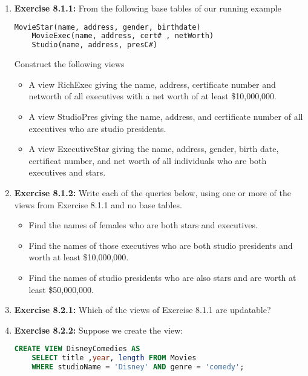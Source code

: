 \documentclass[12pt]{article}
\begin{document}
\begin{enumerate}[1.]
    \item \textbf{Exercise 8.1.1:} From the following base tables of our running
    example

    \bigskip

    \begin{lstlisting}[language=SQL]
    MovieStar(name, address, gender, birthdate)
    MovieExec(name, address, cert# , netWorth)
    Studio(name, address, presC#)
    \end{lstlisting}

    \bigskip

    Construct the following views

    \bigskip

    \begin{itemize}
        \item A view RichExec giving the name, address, certificate number and networth of all executives with a net worth of at least \$10,000,000.
        \item A view StudioPres giving the name, address, and certificate number of all executives who are studio presidents.
        \item A view ExecutiveStar giving the name, address, gender, birth date, certificat number, and net worth of all individuals who are both executives and stars.
    \end{itemize}


    \item \textbf{Exercise 8.1.2:} Write each of the queries below, using one or more of the
    views from Exercise 8.1.1 and no base tables.

    \bigskip

    \begin{itemize}
        \item Find the names of females who are both stars and executives.
        \item Find the names of those executives who are both studio presidents and worth at least \$10,000,000.
        \item Find the names of studio presidents who are also stars and are worth at least \$50,000,000.
    \end{itemize}

    \item \textbf{Exercise 8.2.1:} Which of the views of Exercise 8.1.1 are updatable?
    \item \textbf{Exercise 8.2.2:} Suppose we create the view:

    \begin{lstlisting}[language=SQL]
    CREATE VIEW DisneyComedies AS
    SELECT title ,year, length FROM Movies
    WHERE studioName = 'Disney' AND genre = 'comedy';
    \end{lstlisting}


\end{enumerate}
\end{document}
